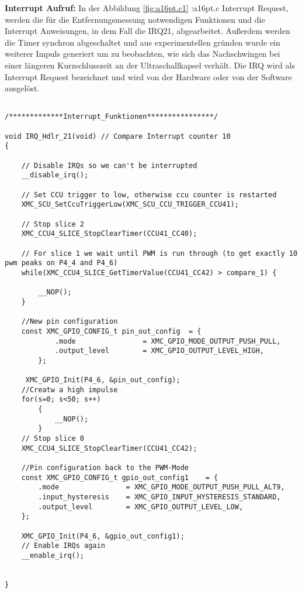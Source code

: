 \textbf{Interrupt Aufruf:}
In der Abbildung \ref{fig:a16pt.c1} :a16pt.c Interrupt Request, werden die für die Entfernungsmessung notwendigen Funktionen und die Interrupt Anweisungen, in dem Fall die IRQ21, abgearbeitet. Außerdem werden die Timer synchron abgeschaltet und aus experimentellen gründen wurde ein weiterer Impuls generiert um zu beobachten, wie sich das Nachschwingen bei einer längeren Kurzschlusszeit an der Ultraschallkapsel verhält. Die IRQ wird als Interrupt Request bezeichnet und wird von der Hardware oder von der Software ausgelöst.
\\
\begin{minipage}{1\textwidth}
\begin{lstlisting}

/*************Interrupt_Funktionen****************/

void IRQ_Hdlr_21(void) // Compare Interrupt counter 10
{

	// Disable IRQs so we can't be interrupted
	__disable_irq();

	// Set CCU trigger to low, otherwise ccu counter is restarted
	XMC_SCU_SetCcuTriggerLow(XMC_SCU_CCU_TRIGGER_CCU41);

	// Stop slice 2
	XMC_CCU4_SLICE_StopClearTimer(CCU41_CC40);

	// For slice 1 we wait until PWM is run through (to get exactly 10 pwm peaks on P4_4 and P4_6)
	while(XMC_CCU4_SLICE_GetTimerValue(CCU41_CC42) > compare_1) {

		__NOP();
	}
	
	//New pin configuration
	const XMC_GPIO_CONFIG_t pin_out_config	= {
			.mode                = XMC_GPIO_MODE_OUTPUT_PUSH_PULL,
			.output_level        = XMC_GPIO_OUTPUT_LEVEL_HIGH,
		};

	 XMC_GPIO_Init(P4_6, &pin_out_config);
	//Creatw a high impulse
	for(s=0; s<50; s++)
		{
			__NOP();
		}
	// Stop slice 0
	XMC_CCU4_SLICE_StopClearTimer(CCU41_CC42);
	
	//Pin configuration back to the PWM-Mode
	const XMC_GPIO_CONFIG_t gpio_out_config1	= {
		.mode                = XMC_GPIO_MODE_OUTPUT_PUSH_PULL_ALT9,
		.input_hysteresis    = XMC_GPIO_INPUT_HYSTERESIS_STANDARD,
		.output_level        = XMC_GPIO_OUTPUT_LEVEL_LOW,
	};

	XMC_GPIO_Init(P4_6, &gpio_out_config1);
	// Enable IRQs again
	__enable_irq();


}
\end{lstlisting}
\label{fig:a16pt.c1}
\end{minipage}

